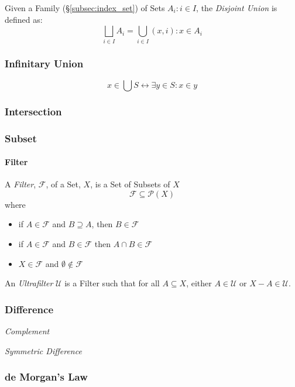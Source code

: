 \documentclass{article}
\begin{document}
Given a Family (\S\ref{subsec:index_set}) of Sets ${A_i : i \in I}$,
the \emph{Disjoint Union} is defined as:
\[
    \bigsqcup_{i \in I} A_i = \bigcup_{i \in I} {(x,i) : x \in A_i}
\]



\subsubsection{Infinitary Union}

\[
    x \in \bigcup S \leftrightarrow \exists y \in S : x \in y
\]



\subsubsection{Intersection}



\subsubsection{Subset}

\paragraph{Filter}

A \emph{Filter}, $\mathcal{F}$, of a Set, $X$, is a Set of Subsets of
$X$
\[
    \mathcal{F} \subseteq \mathcal{P}(X)
\]
where
\begin{itemize}
\item if $A \in \mathcal{F}$ and $B \supseteq A$, then $B \in
  \mathcal{F}$
\item if $A \in \mathcal{F}$ and $B \in \mathcal{F}$ then $A \cap B
  \in \mathcal{F}$
\item $X \in \mathcal{F}$ and $\emptyset \notin \mathcal{F}$
\end{itemize}
An \emph{Ultrafilter} $\mathcal{U}$ is a Filter such that for all $A
\subseteq X$, either $A \in \mathcal{U}$ or $X - A \in \mathcal{U}$.



\subsubsection{Difference}\label{subsec:set_difference}

\emph{Complement}

\emph{Symmetric Difference}



\subsubsection{de Morgan's Law}\label{subsec:de_morgan}
\end{document}
